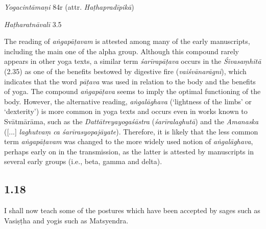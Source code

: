 \begin{ekdosis}
\begin{testimonia}[hp01_017]
\emph{Yogacintāmaṇi} 84r (attr. \emph{Haṭhapradīpikā})

\begin{versinnote}
\end{versinnote}

\emph{Haṭharatnāvalī} 3.5

\begin{versinnote}
\end{versinnote}

\end{testimonia}

\begin{philcomm}[hp01_017]        
The reading of \emph{aṅgapāṭavam} is attested among many of the early manuscripts, including the main one of the alpha group. Although this compound rarely appears in other yoga texts, a similar term \emph{śarīrapāṭava} occurs in the \emph{Śivasaṃhitā} (2.35) as one of the benefits bestowed by digestive fire (\emph{vaiśvānarāgni}), which indicates that the word \emph{pāṭava} was used in relation to the body and the benefits of yoga. The compound \emph{aṅgapāṭava} seems to imply the optimal functioning of the body. However, the alternative reading, \emph{aṅgalāghava} (‘lightness of the limbs’ or ‘dexterity’) is more common in yoga texts and occurs even in works known to Svātmārāma, such as the \emph{Dattātreyayogaśāstra} (\emph{śarīralaghutā}) and the \textit{Amanaska} ([...] \emph{laghutvaṃ ca śarīrasyopajāyate}). Therefore, it is likely that the less common term \emph{aṅgapāṭavam} was changed to the more widely used notion of \emph{aṅgalāghava}, perhaps early on in the transmission, as the latter is attested by manuscripts in several early groups (i.e., beta, gamma and delta).
\end{philcomm}

\subsection*{1.18}
\begin{translation}[hp01_018]
I shall now teach some of the postures which have been accepted by sages  such as Vasiṣṭha and yogis such as Matsyendra.
\end{translation}


\end{ekdosis}
